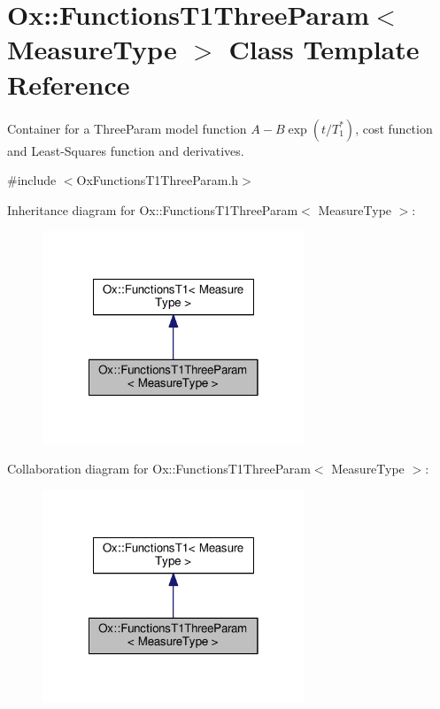 \hypertarget{class_ox_1_1_functions_t1_three_param}{\section{Ox\-:\-:Functions\-T1\-Three\-Param$<$ Measure\-Type $>$ Class Template Reference}
\label{class_ox_1_1_functions_t1_three_param}
}


Container for a Three\-Param model function $ A-B\exp(t/T_1^*) $, cost function and Least-\/\-Squares function and derivatives.  




{\ttfamily \#include $<$Ox\-Functions\-T1\-Three\-Param.\-h$>$}



Inheritance diagram for Ox\-:\-:Functions\-T1\-Three\-Param$<$ Measure\-Type $>$\-:
\nopagebreak
\begin{figure}[H]
\begin{center}
\leavevmode
\includegraphics[width=222pt]{class_ox_1_1_functions_t1_three_param__inherit__graph}
\end{center}
\end{figure}


Collaboration diagram for Ox\-:\-:Functions\-T1\-Three\-Param$<$ Measure\-Type $>$\-:
\nopagebreak
\begin{figure}[H]
\begin{center}
\leavevmode
\includegraphics[width=222pt]{class_ox_1_1_functions_t1_three_param__coll__graph}
\end{center}
\end{figure}
